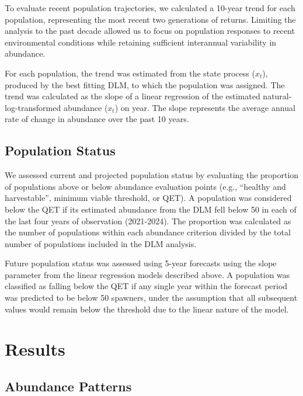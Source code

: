 \documentclass[12pt,a4paper]{article}
\begin{document}
To evaluate recent population trajectories, we calculated a 10-year trend for each population, representing the most recent two generations of returns. Limiting the analysis to the past decade allowed us to focus on population responses to recent environmental conditions while retaining sufficient interannual variability in abundance.

For each population, the trend was estimated from the state process (\(x_t\)), produced by the best fitting DLM, to which the population was assigned. The trend was calculated as the slope of a linear regression of the estimated natural-log-transformed abundance (\(x_t\)) on year. The slope represents the average annual rate of change in abundance over the past 10 years.

\subsection{Population Status}\label{population-status}

We assessed current and projected population status by evaluating the proportion of populations above or below abundance evaluation points (e.g., ``healthy and harvestable'', minimum viable threshold, or QET). A population was considered below the QET if its estimated abundance from the DLM fell below 50 in each of the last four years of observation (2021-2024). The proportion was calculated as the number of populations within each abundance criterion divided by the total number of populations included in the DLM analysis.

Future population status was assessed using 5-year forecasts using the slope parameter from the linear regression models described above. A population was classified as falling below the QET if any single year within the forecast period was predicted to be below 50 spawners, under the assumption that all subsequent values would remain below the threshold due to the linear nature of the model.

\section{Results}\label{results}

\subsection{Abundance Patterns}\label{abundance-patterns-1}
\end{document}
